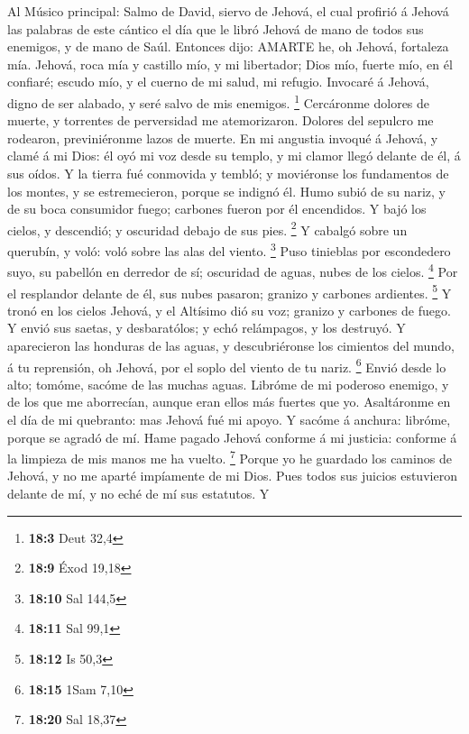  Al Músico principal: Salmo de David, siervo de Jehová, el
cual profirió á Jehová las palabras de este cántico el día que le libró
Jehová de mano de todos sus enemigos, y de mano de Saúl. Entonces dijo:
AMARTE he, oh Jehová, fortaleza mía.  Jehová, roca mía y
castillo mío, y mi libertador; Dios mío, fuerte mío, en él confiaré;
escudo mío, y el cuerno de mi salud, mi refugio.  Invocaré á
Jehová, digno de ser alabado, y seré salvo de mis enemigos. \footnote{\textbf{18:3}
  Deut 32,4}  Cercáronme dolores de muerte, y torrentes de
perversidad me atemorizaron.  Dolores del sepulcro me
rodearon, previniéronme lazos de muerte.  En mi angustia
invoqué á Jehová, y clamé á mi Dios: él oyó mi voz desde su templo, y mi
clamor llegó delante de él, á sus oídos.  Y la tierra fué
conmovida y tembló; y moviéronse los fundamentos de los montes, y se
estremecieron, porque se indignó él.  Humo subió de su
nariz, y de su boca consumidor fuego; carbones fueron por él encendidos.
 Y bajó los cielos, y descendió; y oscuridad debajo de sus
pies. \footnote{\textbf{18:9} Éxod 19,18}  Y cabalgó sobre
un querubín, y voló: voló sobre las alas del viento. \footnote{\textbf{18:10}
  Sal 144,5}  Puso tinieblas por escondedero suyo, su
pabellón en derredor de sí; oscuridad de aguas, nubes de los cielos.
\footnote{\textbf{18:11} Sal 99,1}  Por el resplandor
delante de él, sus nubes pasaron; granizo y carbones ardientes.
\footnote{\textbf{18:12} Is 50,3}  Y tronó en los cielos
Jehová, y el Altísimo dió su voz; granizo y carbones de fuego.
 Y envió sus saetas, y desbaratólos; y echó relámpagos, y
los destruyó.  Y aparecieron las honduras de las aguas, y
descubriéronse los cimientos del mundo, á tu reprensión, oh Jehová, por
el soplo del viento de tu nariz. \footnote{\textbf{18:15} 1Sam 7,10}
 Envió desde lo alto; tomóme, sacóme de las muchas aguas.
 Libróme de mi poderoso enemigo, y de los que me
aborrecían, aunque eran ellos más fuertes que yo. 
Asaltáronme en el día de mi quebranto: mas Jehová fué mi apoyo.
 Y sacóme á anchura: libróme, porque se agradó de mí.
 Hame pagado Jehová conforme á mi justicia: conforme á la
limpieza de mis manos me ha vuelto. \footnote{\textbf{18:20} Sal 18,37}
 Porque yo he guardado los caminos de Jehová, y no me
aparté impíamente de mi Dios.  Pues todos sus juicios
estuvieron delante de mí, y no eché de mí sus estatutos.  Y
